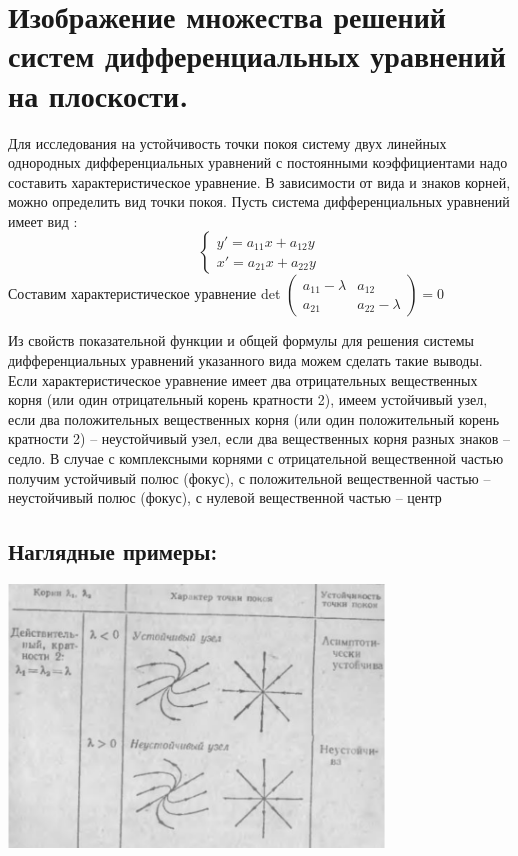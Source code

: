 \documentclass[12pt]{article}
\begin{document}
\section{ Изображение множества решений систем дифференциальных уравнений на плоскости.}

Для исследования на устойчивость точки покоя систему двух линейных однородных дифференциальных уравнений с постоянными коэффициентами надо составить характеристическое уравнение. В зависимости от вида и знаков корней, можно определить вид точки покоя.
Пусть система дифференциальных уравнений имеет вид :
\[
    \begin{cases}
        y'=a_{11}x+a_{12}y \\
        x'=a_{21}x+a_{22}y
    \end{cases}
\]
Составим характеристическое уравнение det
$\begin{pmatrix}
        a_{11}-\lambda & a_{12}         \\
        a_{21}         & a_{22}-\lambda
    \end{pmatrix} =0$


Из свойств показательной функции и общей формулы для решения системы дифференциальных
уравнений указанного вида можем сделать такие выводы.
Если характеристическое уравнение имеет два отрицательных вещественных корня (или один
отрицательный корень кратности 2), имеем устойчивый узел, если два положительных вещественных корня
(или один положительный корень кратности 2) – неустойчивый узел, если два вещественных корня разных
знаков – седло.
В случае с комплексными корнями с отрицательной вещественной частью получим устойчивый полюс
(фокус), с положительной вещественной частью – неустойчивый полюс (фокус), с нулевой вещественной
частью – центр

\subsection{Наглядные примеры:}

\includegraphics[width=100mm]{graphics/31_de_1.png}
\end{document}

